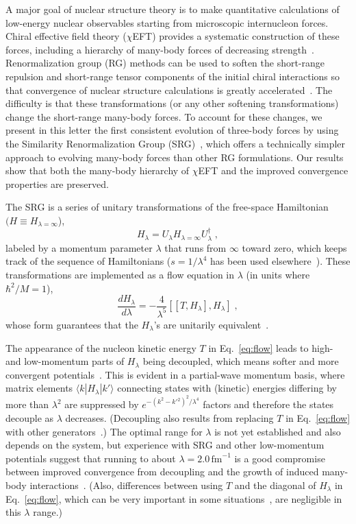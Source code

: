 \documentclass[prc,twocolumn,showpacs,floatfix,nofootinbib,superscriptaddress]{revtex4}
\newcommand{\beqn}{\begin{equation}}
\newcommand{\eeqn}{\end{equation}}
\newcommand{\la}{\langle}
\newcommand{\ra}{\rangle}
\begin{document}
A major goal of nuclear structure theory is to make quantitative
calculations of low-energy nuclear observables starting from microscopic
internucleon forces. Chiral effective field theory ($\chi$EFT)
provides a systematic construction of these forces, including a
hierarchy of many-body forces of decreasing
strength~\cite{Epelbaum:2008ga}. Renormalization group (RG)
methods can be used to soften the short-range repulsion and
short-range tensor components of the initial chiral interactions
so that convergence of nuclear structure calculations is
greatly accelerated~\cite{Bogner:2006vp,Bogner:2007rx}. The
difficulty is that these transformations (or any other softening
transformations) change the short-range many-body forces.   
To account for these changes, we present in this
letter the first consistent evolution of three-body
forces by using the Similarity Renormalization Group 
(SRG)~\cite{Glazek:1993rc,Wegner:1994,Kehrein:2006,Bogner:2006srg,Bogner:2007srg},
which offers a technically simpler approach to evolving
many-body forces than other RG formulations. 
Our results show that both the many-body hierarchy of $\chi$EFT
and the improved convergence properties are preserved.

The SRG is a series of unitary
transformations of the free-space Hamiltonian 
$(H \equiv H_{\lambda=\infty}$), 
%
\beqn
H_{\lambda} = U_{\lambda} H_{\lambda=\infty}U_{\lambda}^{\dagger} \;,
\label{eq:Hs}
\eeqn
%
labeled by a momentum parameter $\lambda$ that runs 
from $\infty$ toward zero,
which keeps track of the
sequence of Hamiltonians ($s = 1/\lambda^4$ 
has been used elsewhere~\cite{Bogner:2006srg,Bogner:2007srg}).
These transformations are implemented as a flow equation in $\lambda$
(in units where $\hbar^2/M = 1$),
%
%
\beqn
 \frac{dH_{\lambda}}{d\lambda} = -\frac{4}{\lambda^5}
                       [[T,H_{\lambda}],H_{\lambda}]  \;,
 \label{eq:flow}
\eeqn
% 
whose form guarantees that the $H_\lambda$'s are unitarily 
equivalent~\cite{Kehrein:2006,Bogner:2006srg}.

The appearance of the nucleon kinetic energy $T$ in
Eq.~\eqref{eq:flow} leads to high- and low-momentum parts of 
$H_{\lambda}$ being decoupled, which means softer and more
convergent potentials~\cite{Jurgenson:2007td}.
This is evident in a partial-wave momentum basis, 
where matrix elements $\la k | H_\lambda | k' \ra$ 
connecting states with (kinetic) energies differing by more than
$\lambda^2$ are suppressed by $e^{-(k^2-k'{}^2)^2/\lambda^4}$ factors 
and therefore the states decouple
as $\lambda$ decreases. 
(Decoupling also results from replacing $T$ in
Eq.~\eqref{eq:flow} with other 
generators~\cite{Kehrein:2006,Bogner:2006srg,Glazek:2008pg,Anderson:2008mu}.)
The
optimal range for $\lambda$ is not yet established and also
depends on the system, but experience with SRG and other
low-momentum potentials suggest  that running to about $\lambda =
2.0\,\mbox{fm}^{-1}$  
is a good compromise between improved
convergence from decoupling and the growth of induced
many-body interactions~\cite{Jurgenson:2007td}.
(Also, differences between using $T$ and the diagonal of $H_\lambda$
in Eq.~\eqref{eq:flow}, which can be very important in some
situations~\cite{Glazek:2008pg}, 
are negligible in this $\lambda$ range.)
\end{document}
